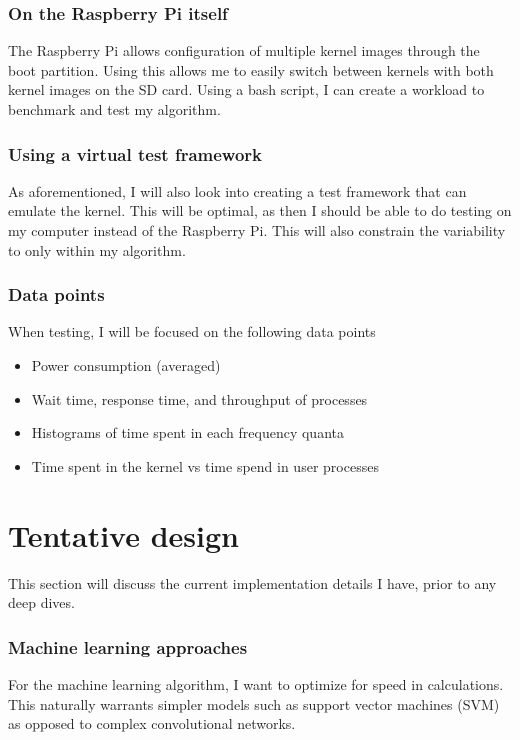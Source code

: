 \documentclass[12pt]{article}
\def\ind{\hspace*{0.3in}}
\begin{document}
\subsubsection*{On the Raspberry Pi itself}

\ind The Raspberry Pi allows configuration of multiple kernel images through the boot partition. Using this allows me to easily switch between kernels with both kernel images on the SD card. Using a bash script, I can create a workload to benchmark and test my algorithm.

\subsubsection*{Using a virtual test framework}

\ind As aforementioned, I will also look into creating a test framework that can emulate the kernel. This will be optimal, as then I should be able to do testing on my computer instead of the Raspberry Pi. This will also constrain the variability to only within my algorithm.

\subsubsection*{Data points}

When testing, I will be focused on the following data points
\begin{itemize}
    \item Power consumption (averaged)
    \item Wait time, response time, and throughput of processes
    \item Histograms of time spent in each frequency quanta
    \item Time spent in the kernel vs time spend in user processes
\end{itemize}

\section*{Tentative design}

This section will discuss the current implementation details I have, prior to any deep dives.

\subsubsection*{Machine learning approaches}
\ind For the machine learning algorithm, I want to optimize for speed in calculations. This naturally warrants simpler models such as support vector machines (SVM) as opposed to complex convolutional networks. 
\end{document}
